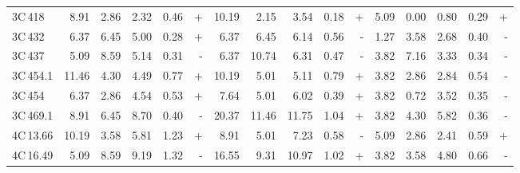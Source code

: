 \documentclass[mathleft,fleqn,%
]{an}
\begin{document}
\begin{table*}
\begin{tabular}{l|rrrrr|rrrrr|rrrrr}
     3C\,418 &   8.91 &   2.86 &   2.32 &   0.46 & +  &  10.19 &   2.15 &   3.54 &   0.18 & +  &   5.09 &   0.00 &   0.80 &   0.29 & +   \\
     3C\,432 &   6.37 &   6.45 &   5.00 &   0.28 & +  &   6.37 &   6.45 &   6.14 &   0.56 & -  &   1.27 &   3.58 &   2.68 &   0.40 & -   \\
     3C\,437 &   5.09 &   8.59 &   5.14 &   0.31 & -  &   6.37 &  10.74 &   6.31 &   0.47 & -  &   3.82 &   7.16 &   3.33 &   0.34 & -   \\
   3C\,454.1 &  11.46 &   4.30 &   4.49 &   0.77 & +  &  10.19 &   5.01 &   5.11 &   0.79 & +  &   3.82 &   2.86 &   2.84 &   0.54 & -   \\
     3C\,454 &   6.37 &   2.86 &   4.54 &   0.53 & +  &   7.64 &   5.01 &   6.02 &   0.39 & +  &   3.82 &   0.72 &   3.52 &   0.35 & -   \\
   3C\,469.1 &   8.91 &   6.45 &   8.70 &   0.40 & -  &  20.37 &  11.46 &  11.75 &   1.04 & +  &   3.82 &   4.30 &   5.82 &   0.36 & -   \\
   4C\,13.66 &  10.19 &   3.58 &   5.81 &   1.23 & +  &   8.91 &   5.01 &   7.23 &   0.58 & -  &   5.09 &   2.86 &   2.41 &   0.59 & +   \\
   4C\,16.49 &   5.09 &   8.59 &   9.19 &   1.32 & -  &  16.55 &   9.31 &  10.97 &   1.02 & +  &   3.82 &   3.58 &   4.80 &   0.66 & -   \\
   \hline
\end{tabular}
\end{table*}






\end{document}
